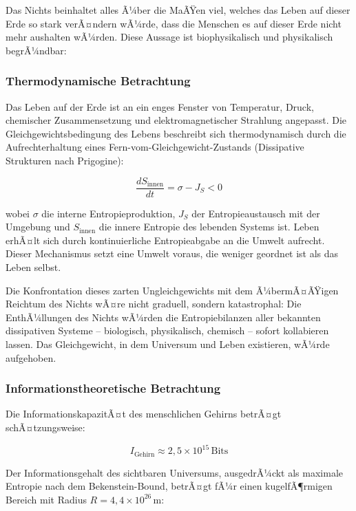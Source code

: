 ﻿\documentclass[12pt,a4paper]{report}
\begin{document}
Das Nichts beinhaltet alles Ã¼ber die MaÃŸen viel, welches das Leben auf dieser Erde so stark verÃ¤ndern wÃ¼rde, dass die Menschen es auf dieser Erde nicht mehr aushalten wÃ¼rden. Diese Aussage ist biophysikalisch und physikalisch begrÃ¼ndbar:

\subsubsection{Thermodynamische Betrachtung}

Das Leben auf der Erde ist an ein enges Fenster von Temperatur, Druck, chemischer Zusammensetzung und elektromagnetischer Strahlung angepasst. Die Gleichgewichtsbedingung des Lebens beschreibt sich thermodynamisch durch die Aufrechterhaltung eines Fern-vom-Gleichgewicht-Zustands (Dissipative Strukturen nach Prigogine):

\begin{equation}
	\frac{dS_{\text{innen}}}{dt} = \sigma - J_S < 0
	\label{eq:dissipative_struktur}
\end{equation}

wobei $\sigma$ die interne Entropieproduktion, $J_S$ der Entropieaustausch mit der Umgebung und $S_{\text{innen}}$ die innere Entropie des lebenden Systems ist. Leben erhÃ¤lt sich durch kontinuierliche Entropieabgabe an die Umwelt aufrecht. Dieser Mechanismus setzt eine Umwelt voraus, die weniger geordnet ist als das Leben selbst.

Die Konfrontation dieses zarten Ungleichgewichts mit dem Ã¼bermÃ¤ÃŸigen Reichtum des Nichts wÃ¤re nicht graduell, sondern katastrophal: Die EnthÃ¼llungen des Nichts wÃ¼rden die Entropiebilanzen aller bekannten dissipativen Systeme -- biologisch, physikalisch, chemisch -- sofort kollabieren lassen. Das Gleichgewicht, in dem Universum und Leben existieren, wÃ¼rde aufgehoben.

\subsubsection{Informationstheoretische Betrachtung}

Die InformationskapazitÃ¤t des menschlichen Gehirns betrÃ¤gt schÃ¤tzungsweise:

\begin{equation}
	I_{\text{Gehirn}} \approx 2{,}5 \times 10^{15}\,\text{Bits}
	\label{eq:gehirn_kapazitaet}
\end{equation}

Der Informationsgehalt des sichtbaren Universums, ausgedrÃ¼ckt als maximale Entropie nach dem Bekenstein-Bound, betrÃ¤gt fÃ¼r einen kugelfÃ¶rmigen Bereich mit Radius $R = 4{,}4 \times 10^{26}\,\text{m}$:
\end{document}
